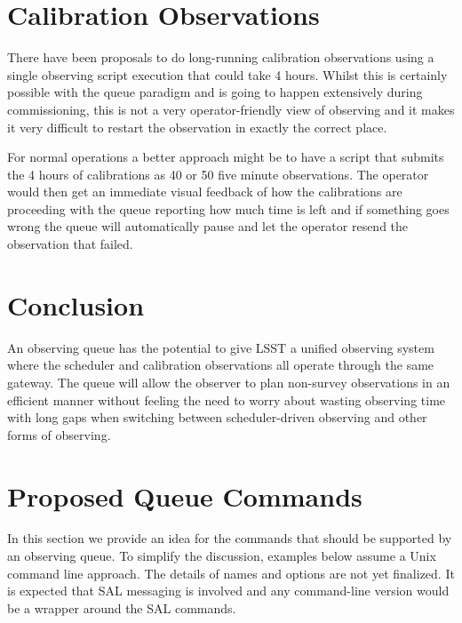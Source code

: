 \documentclass[TS,toc,lsstdraft]{lsstdoc}
\begin{document}
\section{Calibration Observations}

There have been proposals to do long-running calibration observations using a single observing script execution that could take 4 hours.
Whilst this is certainly possible with the queue paradigm and is going to happen extensively during commissioning, this is not a very operator-friendly view of observing and it makes it very difficult to restart the observation in exactly the correct place.

For normal operations a better approach might be to have a script that submits the 4 hours of calibrations as 40 or 50 five minute observations.
The operator would then get an immediate visual feedback of how the calibrations are proceeding with the queue reporting how much time is left and if something goes wrong the queue will automatically pause and let the operator resend the observation that failed.

\section{Conclusion}

An observing queue has the potential to give LSST a unified observing system where the scheduler and calibration observations all operate through the same gateway.
The queue will allow the observer to plan non-survey observations in an efficient manner without feeling the need to worry about wasting observing time with long gaps when switching between scheduler-driven observing and other forms of observing.

\appendix
\section{Proposed Queue Commands}

In this section we provide an idea for the commands that should be supported by an observing queue.
To simplify the discussion, examples below assume a Unix command line approach.
The details of names and options are not yet finalized.
It is expected that SAL messaging is involved and any command-line version would be a wrapper around the SAL commands.
\end{document}
